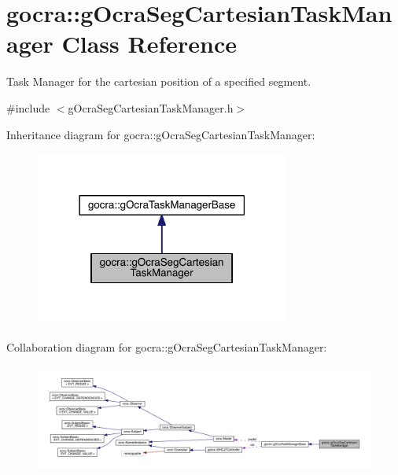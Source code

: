 \hypertarget{classgocra_1_1gOcraSegCartesianTaskManager}{}\section{gocra\+:\+:g\+Ocra\+Seg\+Cartesian\+Task\+Manager Class Reference}
\label{classgocra_1_1gOcraSegCartesianTaskManager}


Task Manager for the cartesian position of a specified segment.  




{\ttfamily \#include $<$g\+Ocra\+Seg\+Cartesian\+Task\+Manager.\+h$>$}



Inheritance diagram for gocra\+:\+:g\+Ocra\+Seg\+Cartesian\+Task\+Manager\+:\nopagebreak
\begin{figure}[H]
\begin{center}
\leavevmode
\includegraphics[width=237pt]{db/dfa/classgocra_1_1gOcraSegCartesianTaskManager__inherit__graph}
\end{center}
\end{figure}


Collaboration diagram for gocra\+:\+:g\+Ocra\+Seg\+Cartesian\+Task\+Manager\+:\nopagebreak
\begin{figure}[H]
\begin{center}
\leavevmode
\includegraphics[width=350pt]{d6/d7e/classgocra_1_1gOcraSegCartesianTaskManager__coll__graph}
\end{center}
\end{figure}
